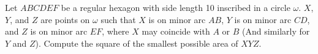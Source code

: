 Let $ABCDEF$ be a regular hexagon with side length 10 inscribed in a circle $\omega$. $X$, $Y$, and $Z$ are points on $\omega$ such that $X$ is on minor arc $AB$, $Y$ is on minor arc $CD$, and $Z$ is on minor arc $EF$, where $X$ may coincide with $A$ or $B$ (And similarly for $Y$ and $Z$). Compute the square of the smallest possible area of $XYZ$.
